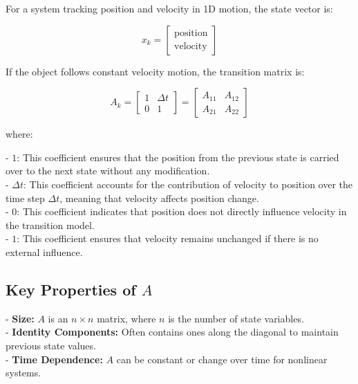 \documentclass{article}
\begin{document}
For a system tracking position and velocity in 1D motion, the state vector is:

\begin{equation}
    x_k = \begin{bmatrix} 
        \text{position} \\
        \text{velocity} 
    \end{bmatrix}
\end{equation}

If the object follows constant velocity motion, the transition matrix is:

\begin{equation}
    A_k = \begin{bmatrix} 
        1 & \Delta t \\
        0 & 1 
    \end{bmatrix} = \begin{bmatrix} 
        A_{11} & A_{12} \\
        A_{21} & A_{22}
    \end{bmatrix}
\end{equation}

where:

- $1$: This coefficient ensures that the position from the previous state is carried over to the next state without any modification.\\
- $\Delta t$: This coefficient accounts for the contribution of velocity to position over the time step $\Delta t$, meaning that velocity affects position change.\\
- $0$: This coefficient indicates that position does not directly influence velocity in the transition model.\\
- $1$: This coefficient ensures that velocity remains unchanged if there is no external influence.\\

\subsection*{Key Properties of $A$}

- \textbf{Size:} $A$ is an $n \times n$ matrix, where $n$ is the number of state variables.\\
- \textbf{Identity Components:} Often contains ones along the diagonal to maintain previous state values.\\
- \textbf{Time Dependence:} $A$ can be constant or change over time for nonlinear systems.\\
\end{document}
